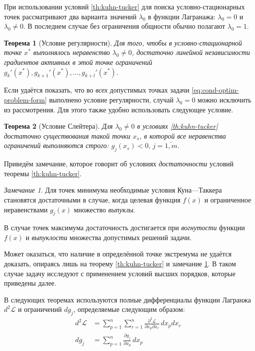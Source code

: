 \documentclass{article}
\providecommand{\La}{\mathcal{L}}
\providecommand{\pardiff}[2]{\frac{\partial{#1}}{\partial{#2}}}
\providecommand{\dpardiff}[3]{\frac{\partial^2{#1}}{\partial{#2}\partial{#3}}}
\newtheorem{thm}{Теорема}[section]
\theoremstyle{remark}
\newtheorem{rem}{Замечание}[section]
\theoremstyle{definition}
\numberwithin{equation}{section}
\begin{document}
При использовании условий \ref{th:kuhn-tucker} для поиска
условно-стационарных точек рассматривают два варианта значений
$\lambda_0$ в функции Лагранажа: $\lambda_0=0$ и $\lambda_0 \neq 0$. В
последнем случае без ограничения общности обычно полагают $\lambda_0 =
1$.

\begin{thm}[Условие регулярности]
  Для того, чтобы в условно-стационарной точке $x^*$ выполнялось
  неравенство $\lambda_0 \neq 0$, достаточно линейной независимости
  градиентов активных в этой точке ограничений $g_k'(x^*),
  g_{k+1}'(x^*), \dotsc, g_{k+l}'(x^*)$.
\end{thm}

Если удаётся показать, что во \emph{всех} допустимых точках задачи
\eqref{eq:cond-optim-problem-form} выполнено условие регулярности,
случай $\lambda_0=0$ можно исключить из рассмотрения. Для этого также
удобно использовать следующее условие.

\begin{thm}[Условие Слейтера]
  \label{th:slater}
  Для $\lambda_0 \neq 0$ в условиях \ref{th:kuhn-tucker} достаточно
  существования такой точки $x_s$, в которой все неравенства
  ограничений выполняются строго: $g_j(x_s)<0, \, j=\overline{1,m}$.
\end{thm}

Приведём замечание, которое говорит об условиях \emph{достаточности}
условий теоремы \ref{th:kuhn-tucker}.

\begin{rem}
  \label{rem:kt-cond}
  Для точек минимума необходимые условия Куна—Таккера становятся
  достаточными в случае, когда целевая функция $f(x)$ и ограниченное
  неравенствами $g_j(x)$ множество \emph{выпуклы}.

  В случае точек максимума достаточность достигается при
  \emph{вогнутости} функции $f(x)$ и \emph{выпуклости} множества
  допустимых решений задачи.
\end{rem}

Может оказаться, что наличие в определённой точке экстремума не
удаётся доказать, опираясь лишь на теорему \ref{th:kuhn-tucker} и
замечание \ref{rem:kt-cond}. В таком случае задачу исследуют с
применением условий высших порядков, которые приведены далее.

В следующих теоремах используются полные дифференциалы функции
Лагранжа $d^2\La$ и ограничений $dg_j$, определяемые следующим
образом:
\begin{align*}
  d^2\La &= \sum_{p=1}^n\sum_{r=1}^n{\dpardiff{\La}{x_p}{x_r}\,dx_pdx_r} \\
  dg_j &= \sum_{p=1}^n{\pardiff{g_j}{x_p}\,dx_p}
\end{align*}
\end{document}
